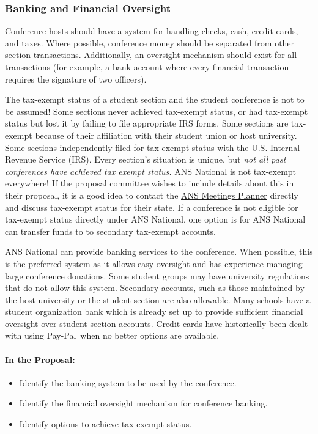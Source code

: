 \documentclass[12pt]{article}
\begin{document}
\subsubsection{Banking and Financial Oversight}
Conference hosts should have a system for handling checks, cash, credit cards, and taxes.
Where possible, conference money should be separated from other section transactions.
Additionally, an oversight mechanism should exist for all transactions (for example, a
bank account where every financial transaction requires the signature of two officers).

The tax-exempt status of a student section and the student conference is not to be
assumed! Some sections never achieved tax-exempt status, or had tax-exempt status but
lost it by failing to file appropriate IRS forms. Some sections are tax-exempt because of
their affiliation with their student union or host university. Some sections independently
filed for tax-exempt status with the U.S. Internal Revenue Service (IRS). Every section’s situation is unique, but \textit{not all past conferences have achieved tax exempt status.}
ANS National is not tax-exempt everywhere! 
If the proposal committee wishes to include details about this in their proposal, it is a good idea to contact the \href{http://www.ans.org/about/staff/}{ANS Meetings Planner} directly and discuss tax-exempt status for their state. If a conference is not eligible for tax-exempt status directly under ANS National, one option is for ANS National can transfer funds to to secondary tax-exempt accounts.

ANS National can provide banking services to the conference. When possible, this is the preferred system as it allows easy oversight and has experience managing large conference donations. 
Some student groups may have university regulations that do not allow
this system. Secondary accounts, such as those maintained by the host university or the student section are also allowable.
Many schools have a student organization bank which is already set up to
provide sufficient financial oversight over student section accounts.
Credit cards have historically been dealt with using Pay-Pal\texttrademark\ when no better options are available.

\paragraph{In the Proposal:}
\begin{itemize}
\item{Identify the banking system to be used by the conference.}
\item{Identify the financial oversight mechanism for conference banking.}
\item{Identify options to achieve tax-exempt status.}
\end{itemize}
\end{document}
